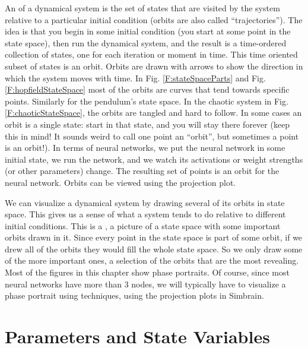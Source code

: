 An  of a dynamical system is the set of states that are visited by the system relative to a particular initial condition (orbits are also called ``trajectories''). The idea is that you begin in some initial condition (you start at some point  in the state space), then run the dynamical system, and the result is a time-ordered collection of states, one for each iteration or moment in time. This time oriented subset of states is an orbit. Orbits are drawn with arrows to show the direction in which the system moves with time. In Fig. \ref{F:stateSpaceParts} and Fig. \ref{F:hopfieldStateSpace} most of the orbits are curves that tend towards specific points. Similarly for the pendulum's state space. In the chaotic system in Fig. \ref{F:chaoticStateSpace}, the orbits are tangled and hard to follow. In some cases an orbit is a single state: start in that state, and you will stay there forever (keep this in mind! It sounds weird to call one point an ``orbit'', but sometimes a point is an orbit!). In terms of  neural networks, we put the neural network in some initial state, we run the  network, and we watch its activations or weight strengths (or other parameters) change. The resulting set of points is an orbit for the neural network. Orbits can be viewed using the projection plot.

We can visualize a dynamical system by drawing several of its orbits in  state space. This gives us a sense of what a system tends to do relative to different initial conditions. This is a  , a picture of a state space with some important orbits drawn in it. Since every point in the state space is part of some orbit, if we drew all of  the orbits they would fill the whole state space. So we only draw some of the  more important ones, a selection of the orbits that are the most revealing. Most of the figures in this chapter show phase portraits. Of course, since most neural networks have more than 3 nodes, we will  typically have to visualize a phase portrait using  techniques, using the  projection plots in Simbrain. 

\section{Parameters and State Variables}


